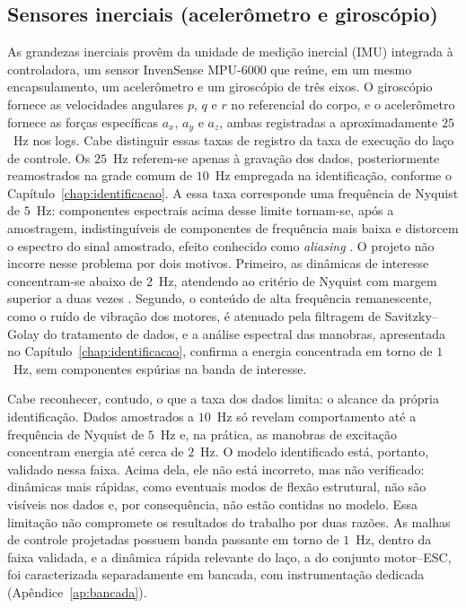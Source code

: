 \subsection{Sensores inerciais (acelerômetro e giroscópio)}

As grandezas inerciais provêm da unidade de medição inercial (IMU) integrada à controladora, um sensor InvenSense MPU-6000 que reúne, em um mesmo encapsulamento, um acelerômetro e um giroscópio de três eixos. O giroscópio fornece as velocidades angulares $p$, $q$ e $r$ no referencial do corpo, e o acelerômetro fornece as forças específicas $a_x$, $a_y$ e $a_z$, ambas registradas a aproximadamente $25$~Hz nos logs. Cabe distinguir essas taxas de registro da taxa de execução do laço de controle. Os $25$~Hz referem-se apenas à gravação dos dados, posteriormente reamostrados na grade comum de $10$~Hz empregada na identificação, conforme o Capítulo~\ref{chap:identificacao}. A essa taxa corresponde uma frequência de Nyquist de $5$~Hz: componentes espectrais acima desse limite tornam-se, após a amostragem, indistinguíveis de componentes de frequência mais baixa e distorcem o espectro do sinal amostrado, efeito conhecido como \textit{aliasing} \cite{Aguirre2015}. O projeto não incorre nesse problema por dois motivos. Primeiro, as dinâmicas de interesse concentram-se abaixo de $2$~Hz, atendendo ao critério de Nyquist com margem superior a duas vezes \cite{Jategaonkar2015}. Segundo, o conteúdo de alta frequência remanescente, como o ruído de vibração dos motores, é atenuado pela filtragem de Savitzky--Golay do tratamento de dados, e a análise espectral das manobras, apresentada no Capítulo~\ref{chap:identificacao}, confirma a energia concentrada em torno de $1$~Hz, sem componentes espúrias na banda de interesse.

Cabe reconhecer, contudo, o que a taxa dos dados limita: o alcance da própria identificação. Dados amostrados a $10$~Hz só revelam comportamento até a frequência de Nyquist de $5$~Hz e, na prática, as manobras de excitação concentram energia até cerca de $2$~Hz. O modelo identificado está, portanto, validado nessa faixa. Acima dela, ele não está incorreto, mas não verificado: dinâmicas mais rápidas, como eventuais modos de flexão estrutural, não são visíveis nos dados e, por consequência, não estão contidas no modelo. Essa limitação não compromete os resultados do trabalho por duas razões. As malhas de controle projetadas possuem banda passante em torno de $1$~Hz, dentro da faixa validada, e a dinâmica rápida relevante do laço, a do conjunto motor--ESC, foi caracterizada separadamente em bancada, com instrumentação dedicada (Apêndice~\ref{ap:bancada}).

